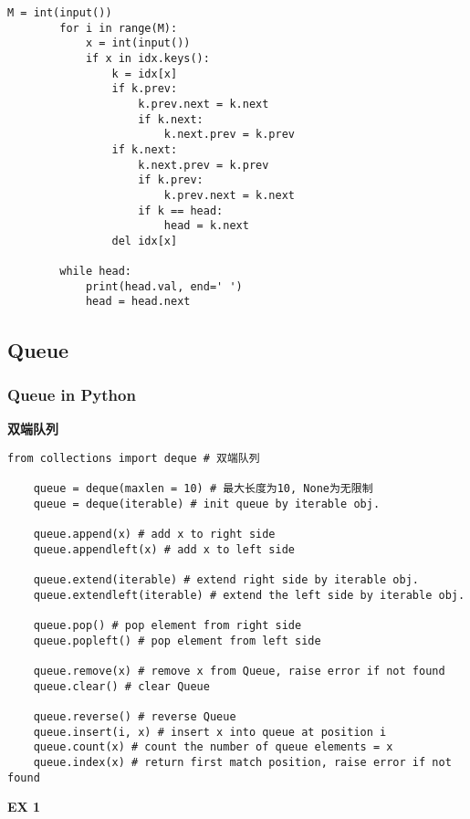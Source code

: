 \documentclass{ctexart}
\begin{document}
\begin{sloppy}
\begin{lstlisting}[style = Python]
        M = int(input())
        for i in range(M):
            x = int(input())
            if x in idx.keys():
                k = idx[x]
                if k.prev:
                    k.prev.next = k.next
                    if k.next:
                        k.next.prev = k.prev
                if k.next:
                    k.next.prev = k.prev
                    if k.prev:
                        k.prev.next = k.next
                    if k == head:
                        head = k.next
                del idx[x]
        
        while head:
            print(head.val, end=' ')
            head = head.next
    \end{lstlisting}

    \subsection{Queue}

    \subsubsection{Queue in Python}

    \textbf{双端队列}

    \begin{lstlisting}[style = Python]
    from collections import deque # 双端队列

    queue = deque(maxlen = 10) # 最大长度为10, None为无限制
    queue = deque(iterable) # init queue by iterable obj.

    queue.append(x) # add x to right side
    queue.appendleft(x) # add x to left side

    queue.extend(iterable) # extend right side by iterable obj.
    queue.extendleft(iterable) # extend the left side by iterable obj.

    queue.pop() # pop element from right side 
    queue.popleft() # pop element from left side

    queue.remove(x) # remove x from Queue, raise error if not found
    queue.clear() # clear Queue

    queue.reverse() # reverse Queue
    queue.insert(i, x) # insert x into queue at position i
    queue.count(x) # count the number of queue elements = x
    queue.index(x) # return first match position, raise error if not found

    \end{lstlisting}

    \textbf{EX 1}


\end{sloppy}
\end{document}
